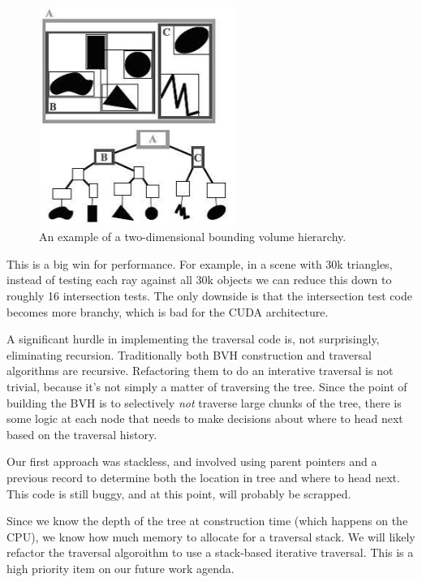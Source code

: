 \documentclass{acmsiggraph}                     %
\begin{document}
    \begin{figure}[htb]
        \begin{center}
            \leavevmode
            \includegraphics[width=2.5in]{bvh.png}
        \end{center}
        \caption{An example of a two-dimensional bounding volume hierarchy.}
        \label{fig:bvh}
    \end{figure}

    This is a big win for performance. For example, in a scene with 30k triangles, instead of
    testing each ray against all 30k objects we can reduce this down to roughly 16 intersection tests.
    The only downside is that the intersection test code becomes more branchy, which is bad
    for the CUDA architecture.

    A significant hurdle in implementing the traversal code is, not surprisingly, eliminating
    recursion. Traditionally both BVH construction and traversal algorithms are recursive.
    Refactoring them to do an interative traversal is not trivial, because it's not simply a
    matter of traversing the tree. Since the point of building the BVH is to selectively
    \emph{not} traverse large chunks of the tree, there is some logic at each node that needs
    to make decisions about where to head next based on the traversal history.

    Our first approach was stackless, and involved using parent pointers and a previous record
    to determine both the location in tree and where to head next. This code is still buggy,
    and at this point, will probably be scrapped.

    Since we know the depth of the tree at construction time (which happens on the CPU), we know
    how much memory to allocate for a traversal stack. We will likely refactor the traversal
    algoroithm to use a stack-based iterative traversal. This is a high priority item on
    our future work agenda.
\end{document}
